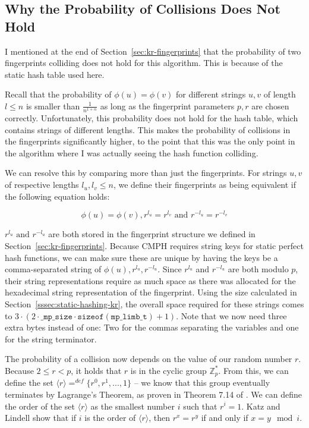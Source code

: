 \documentclass[ %
                    author={Dominic Joseph Moylett},
                    degree={MEng},
                     title={Dictionary Matching with Fingerprints},
                  subtitle={An Empirical Analysis},
                      type={research},
                      year={2015} ]{dissertation}
\begin{document}
\subsection{Why the Probability of Collisions Does Not Hold}
\label{ssec:short-collisions}

I mentioned at the end of Section~\ref{sec:kr-fingerprints} that the probability of two fingerprints colliding does not hold for this algorithm. This is because of the static hash table used here.

Recall that the probability of $\phi(u) = \phi(v)$ for different strings $u, v$ of length $l \leq n$ is smaller than $\frac{1}{n^{1 + \alpha}}$ as long as the fingerprint parameters $p, r$ are chosen correctly. Unfortunately, this probability does not hold for the hash table, which contains strings of different lengths. This makes the probability of collisions in the fingerprints significantly higher, to the point that this was the only point in the algorithm where I was actually seeing the hash function colliding.

We can resolve this by comparing more than just the fingerprints. For strings $u, v$ of respective lengths $l_u, l_v \leq n$, we define their fingerprints as being equivalent if the following equation holds:

$$\phi(u) = \phi(v), r^{l_u} = r^{l_v} \text{ and } r^{-l_u} = r^{-l_v}$$

$r^{l_u} \text{ and } r^{-l_u}$ are both stored in the fingerprint structure we defined in Section~\ref{sec:kr-fingerprints}. Because CMPH requires string keys for static perfect hash functions, we can make sure these are unique by having the keys be a comma-separated string of $\phi(u),r^{l_u},r^{-l_u}$. Since $r^{l_u}$ and $r^{-l_u}$ are both modulo $p$, their string representations require as much space as there was allocated for the hexadecimal string representation of the fingerprint. Using the size calculated in Section~\ref{sssec:static-hashing-kr}, the overall space required for these strings comes to $3 \cdot (2 \cdot \texttt{\_mp\_size} \cdot \texttt{sizeof}(\texttt{mp\_limb\_t}) + 1)$. Note that we now need three extra bytes instead of one: Two for the commas separating the variables and one for the string terminator.

The probability of a collision now depends on the value of our random number $r$. Because $2 \leq r < p$, it holds that $r$ is in the cyclic group $\mathbb{Z}^*_p$. From this, we can define the set $\langle r \rangle =^{def} \{r^0, r^1,...,1\}$ -- we know that this group eventually terminates by Lagrange's Theorem, as proven in Theorem 7.14 of \cite{katz:lagrange}. We can define the order of the set $\langle r \rangle$ as the smallest number $i$ such that $r^i = 1$. Katz and Lindell \cite{katz:cyclic-groups} show that if $i$ is the order of $\langle r \rangle$, then $r^x = r^y$ if and only if $x = y \mod i$.
\end{document}
